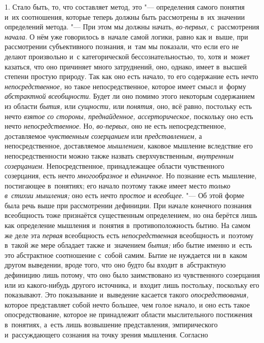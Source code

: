 1. Стало быть, то, что составляет метод, это
"--- определения самого понятия и~их соотношения, которые теперь
должны быть рассмотрены в~их значении определений метода. "---
При этом мы должны начать, {\em во-первых,} с~рассмотрения {\em начала}.
О нём уже говорилось в~начале самой логики, равно как и~выше,
при рассмотрении субъективного познания, и~там мы показали, что если его не
делают произвольно и~с категорической бессознательностью, то, хотя и~может
казаться, что оно причиняет много затруднений, оно, однако,
имеет в~высшей степени простую природу. Так как оно есть начало, то его
содержание есть нечто {\em непосредственное,}
но такое непосредственное, которое имеет смысл и~форму
{\em абстрактной всеобщности}.
Будет ли оно помимо этого некоторым содержанием из области
{\em бытия,} или {\em сущности,} или {\em понятия,} оно, всё
равно, постольку есть нечто {\em взятое
со стороны, преднайденное, ассерторическое,} поскольку оно
есть нечто {\em непосредственное}. Но, {\em во-первых,}
оно не есть непосредственное, доставляемое
{\em чувственным созерцанием} или {\em представлением,}
а непосредственное, доставляемое {\em мышлением,} каковое
мышление вследствие его непосредственности можно также назвать
сверхчувственным, {\em внутренним
созерцанием}. Непосредственное, принадлежащее области
чувственного созерцания, есть нечто
{\em многообразное} и {\em единичное}. Но
познание есть мышление, постигающее в~понятиях; его начало поэтому также
имеет место {\em только в~стихии
мышления;} оно есть нечто {\em простое} и {\em всеобщее}. "--- Об этой
форме была речь выше при рассмотрении дефиниции. При начале конечного
познания всеобщность тоже признаётся существенным определением, но она
берётся лишь как определение мышления и~понятия в~противоположность бытию.
На самом же деле эта {\em первая} всеобщность есть {\em непосредственная}
всеобщность и~поэтому в~такой же мере обладает также и~значением {\em бытия;}
ибо бытие именно и~есть это абстрактное соотношение с~собой
самим. Бытие не нуждается ни в~каком другом выведении, вроде того, что оно
будто бы входит в~абстрактную дефиницию лишь потому, что оно было
заимствовано из чувственного созерцания или из какого-нибудь другого
источника, и~входит лишь постольку, поскольку его показывают. Это
показывание и~выведение касается такого {\em опосредствования,}
которое представляет собой нечто большее, чем голое начало, и
оно есть такое опосредствование, которое не принадлежит области
мыслительного постижения в~понятиях, а~есть лишь возвышение представления,
эмпирического и~рассуждающего сознания на точку зрения мышления. Согласно
